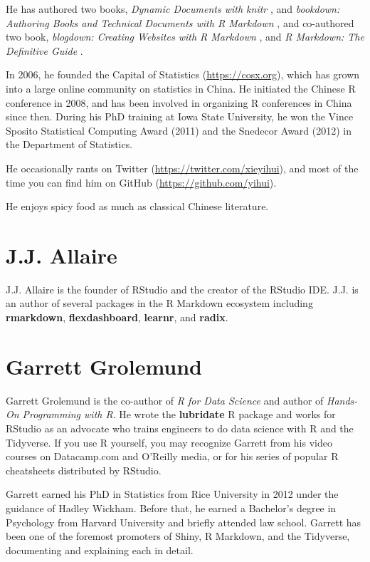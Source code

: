 \documentclass[
  11pt,
]{krantz}
\theoremstyle{definition}
\theoremstyle{definition}
\theoremstyle{definition}
\theoremstyle{definition}
\theoremstyle{remark}
\begin{document}
He has authored two books, \emph{Dynamic Documents with knitr} \citep{xie2015}, and \emph{bookdown: Authoring Books and Technical Documents with R Markdown} \citep{xie2016}, and co-authored two book, \emph{blogdown: Creating Websites with R Markdown} \citep{xie2017}, and \emph{R Markdown: The Definitive Guide} \citep{xie2018}.

In 2006, he founded the Capital of Statistics (\url{https://cosx.org}), which has grown into a large online community on statistics in China. He initiated the Chinese R conference in 2008, and has been involved in organizing R conferences in China since then. During his PhD training at Iowa State University, he won the Vince Sposito Statistical Computing Award (2011) and the Snedecor Award (2012) in the Department of Statistics.

He occasionally rants on Twitter (\url{https://twitter.com/xieyihui}), and most of the time you can find him on GitHub (\url{https://github.com/yihui}).

He enjoys spicy food as much as classical Chinese literature.

\hypertarget{j.j.-allaire}{%
\section*{J.J. Allaire}\label{j.j.-allaire}}


J.J. Allaire is the founder of RStudio and the creator of the RStudio IDE. J.J. is an author of several packages in the R Markdown ecosystem including \textbf{rmarkdown}, \textbf{flexdashboard}, \textbf{learnr}, and \textbf{radix}.

\hypertarget{garrett-grolemund}{%
\section*{Garrett Grolemund}\label{garrett-grolemund}}


Garrett Grolemund is the co-author of \emph{R for Data Science} and author of \emph{Hands-On Programming with R}. He wrote the \textbf{lubridate} R package and works for RStudio as an advocate who trains engineers to do data science with R and the Tidyverse. If you use R yourself, you may recognize Garrett from his video courses on Datacamp.com and O'Reilly media, or for his series of popular R cheatsheets distributed by RStudio.

Garrett earned his PhD in Statistics from Rice University in 2012 under the guidance of Hadley Wickham. Before that, he earned a Bachelor's degree in Psychology from Harvard University and briefly attended law school. Garrett has been one of the foremost promoters of Shiny, R Markdown, and the Tidyverse, documenting and explaining each in detail.
\end{document}
